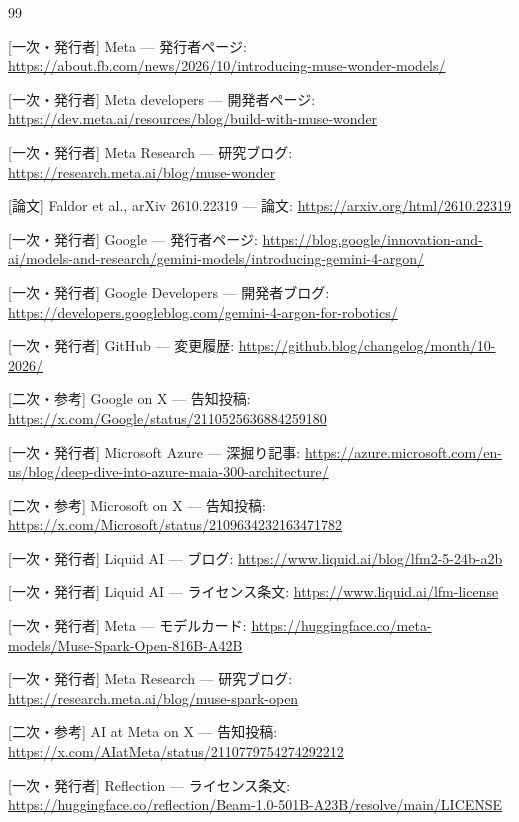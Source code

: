 \documentclass[lualatex,a4paper,10pt]{jlreq}
\begin{document}
\begin{thebibliography}{99}

 [一次・発行者] Meta — 発行者ページ: \url{https://about.fb.com/news/2026/10/introducing-muse-wonder-models/}

 [一次・発行者] Meta developers — 開発者ページ: \url{https://dev.meta.ai/resources/blog/build-with-muse-wonder}

 [一次・発行者] Meta Research — 研究ブログ: \url{https://research.meta.ai/blog/muse-wonder}

 [論文] Faldor et al., arXiv 2610.22319 — 論文: \url{https://arxiv.org/html/2610.22319}

 [一次・発行者] Google — 発行者ページ: \url{https://blog.google/innovation-and-ai/models-and-research/gemini-models/introducing-gemini-4-argon/}

 [一次・発行者] Google Developers — 開発者ブログ: \url{https://developers.googleblog.com/gemini-4-argon-for-robotics/}

 [一次・発行者] GitHub — 変更履歴: \url{https://github.blog/changelog/month/10-2026/}

 [二次・参考] Google on X — 告知投稿: \url{https://x.com/Google/status/2110525636884259180}

 [一次・発行者] Microsoft Azure — 深掘り記事: \url{https://azure.microsoft.com/en-us/blog/deep-dive-into-azure-maia-300-architecture/}

 [二次・参考] Microsoft on X — 告知投稿: \url{https://x.com/Microsoft/status/2109634232163471782}

 [一次・発行者] Liquid AI — ブログ: \url{https://www.liquid.ai/blog/lfm2-5-24b-a2b}

 [一次・発行者] Liquid AI — ライセンス条文: \url{https://www.liquid.ai/lfm-license}

 [一次・発行者] Meta — モデルカード: \url{https://huggingface.co/meta-models/Muse-Spark-Open-816B-A42B}

 [一次・発行者] Meta Research — 研究ブログ: \url{https://research.meta.ai/blog/muse-spark-open}

 [二次・参考] AI at Meta on X — 告知投稿: \url{https://x.com/AIatMeta/status/2110779754274292212}

 [一次・発行者] Reflection — ライセンス条文: \url{https://huggingface.co/reflection/Beam-1.0-501B-A23B/resolve/main/LICENSE}


\end{thebibliography}
\end{document}

